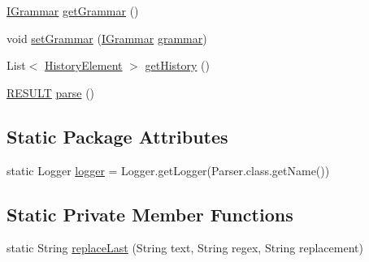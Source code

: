 \begin{DoxyCompactItemize}
\hyperlink{interfacecontext_free_1_1grammar_1_1_i_grammar}{I\-Grammar} \hyperlink{classparser_program_1_1_parser_a65d7eacbbc222a4b4bee5c31227313ea}{get\-Grammar} ()
\item 
void \hyperlink{classparser_program_1_1_parser_a3f672f1f86da2ddc6fb9c068ac1b3439}{set\-Grammar} (\hyperlink{interfacecontext_free_1_1grammar_1_1_i_grammar}{I\-Grammar} \hyperlink{classparser_program_1_1_parser_a4a70fbf9ba96a8d228f6e569641755ae}{grammar})
\item 
List$<$ \hyperlink{classparser_program_1_1_history_element}{History\-Element} $>$ \hyperlink{classparser_program_1_1_parser_a3073cc18265fe23d58e5b4dd02905a2e}{get\-History} ()
\item 
\hyperlink{enumparser_program_1_1_r_e_s_u_l_t}{R\-E\-S\-U\-L\-T} \hyperlink{classparser_program_1_1_parser_a1dbfee8bebaafc33cdc821b978bba38a}{parse} ()
\end{DoxyCompactItemize}
\subsection*{Static Package Attributes}
\begin{DoxyCompactItemize}
\item 
static Logger \hyperlink{classparser_program_1_1_parser_ac181ea955dedf17144ec49b6c57a9d55}{logger} = Logger.\-get\-Logger(Parser.\-class.\-get\-Name())
\end{DoxyCompactItemize}
\subsection*{Static Private Member Functions}
\begin{DoxyCompactItemize}
\item 
static String \hyperlink{classparser_program_1_1_parser_a7c2bfbcc5791523125e01a37b19e0392}{replace\-Last} (String text, String regex, String replacement)
\end{DoxyCompactItemize}
